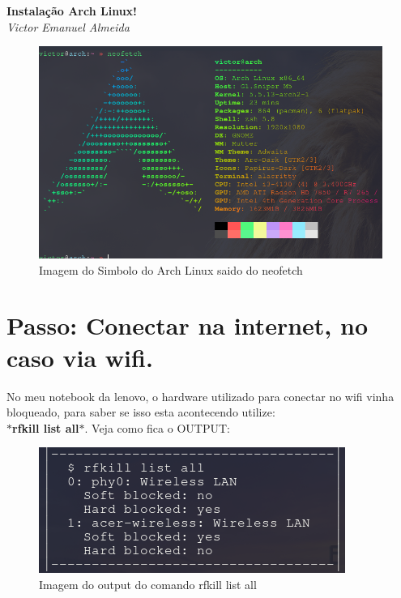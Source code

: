 \documentclass[12pt, a4paper] {article}
\begin{document}
	\begin{titlepage}
	\begin{center}
		\Large\textbf{Instalação Arch Linux!}\\
		\large\textit{Victor Emanuel Almeida}
  \end{center}
		\begin{figure}[htb]
			\centering
			\includegraphics[width=\linewidth]{images/Simbolo.png}
			\caption{Imagem do Simbolo do Arch Linux saido do neofetch}
			\label{fig:neofetch}
		\end{figure}
		\end{titlepage}
	
	\section{Passo: Conectar na internet, no caso via wifi.}
		
	No meu notebook da lenovo, o hardware utilizado para conectar no wifi vinha bloqueado, para saber se isso esta acontecendo utilize:\\
	 	\textbf{$\ast$rfkill list all$\ast$}. Veja como fica o OUTPUT:
		\begin{figure}[htb]
			\centering
			\includegraphics[width=\linewidth]{images/1.png}
			\caption{Imagem do output do comando rfkill list all}
			\label{fig:rfkill}
		\end{figure}
\end{document}
